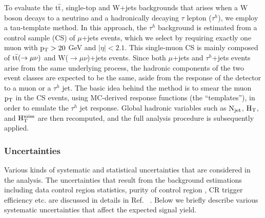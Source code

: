 To evaluate the $\rm t\bar{t}$, single-top and W+jets backgrounds
that arises when a W boson decays to a neutrino and
a hadronically decaying $\tau$ lepton ($\tau^{h}$),
we employ a tau-template method. %
In this approach, the $\tau^{h}$ background is estimated from a control sample (CS)
of $\mu$+jets events,
which we select by requiring exactly one muon with $\rm p_{T}>20$ GeV and $|\eta|<2.1$. 
This single-muon CS is
mainly composed of $\rm t\bar{t}(\rightarrow \mu\nu)$ and W($\rightarrow \mu\nu$)+jets events.
Since both $\mu$+jets and $\tau^{h}$+jets events 
arise from the same underlying process,
the hadronic components of the two event classes are expected to be the same,
aside from the response of the 
detector to a muon or a $\tau^{h}$ jet. 
The basic idea behind the method
is to smear the muon $\rm p_{T}$ in the CS events,
using MC-derived response functions (the ``templates''),
in order to emulate the $\tau^{h}$ jet response.
Global hadronic variables such as $\rm N_{jet}$, $\rm H_{T}$, and $\rm H_{T}^{miss}$
are then recomputed, and the full analysis procedure is subsequently applied. 






\subsubsection{Uncertainties}

Various kinds of systematic and statistical uncertainties that are considered in the analysis. The uncertainties that result from the background estimations including data control region statistics, purity of control region , CR trigger efficiency etc. are discussed in details in Ref. ~\cite{CMS-PAS-SUS-15-002}. Below we briefly describe various systematic uncertainties that affect the expected signal yield.


